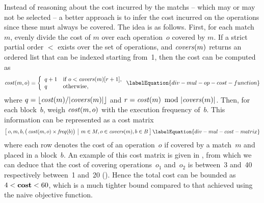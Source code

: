Instead of reasoning about the cost incurred by the \glspl{match} -- which may
or may not be selected -- a better approach is to infer the cost incurred on the
\glspl{operation} since these must always be covered.
%
The idea is as follows.
%
First, for each \gls{match}~$m$, evenly divide the cost of $m$ over each
\gls{operation}~$o$ covered by $m$.
%
If a strict partial order $<$ exists over the set of \glspl{operation}, and
$\operatorname{\textrm{\textit{covers}}}(m)$ returns an ordered list that can be indexed starting from~\num{1},
then the cost can be computed as
%
\begin{equation}
  \mOpCost(m, o) =
  \left\{
  \begin{array}{ll}
    q + 1 & \text{if $o < \mCovers(m)[r+1]$}, \\
    q     & \text{otherwise}, \\
  \end{array}
  \right.
  \labelEquation{div-mul-op-cost-function}
\end{equation}
%
where \mbox{$q = \lfloor \mCost(m) / \mCard{\!\mCovers(m)} \rfloor$} and
\mbox{$r = \mCost(m) \! \mod \mCard{\!\mCovers(m)}$}.
%
Then, for each \gls{block}~$b$, weigh \mbox{$\operatorname{\textrm{\textit{cost}}}(m, o)$} with the execution
frequency of~$b$.
%
This information can be represented as a cost matrix
%
\begin{equation}
  \begin{bmatrix}
    \begin{array}{@{\:}c|c@{\:}}
        o, m, b, \big( \mOpCost(m, o) \times \mFreq(b) \big)
      & m \in \mMatchSet, o \in \mCovers(m), b \in \mBlockSet
    \end{array}
  \end{bmatrix}
  \labelEquation{div-mul-cost-matrix}
\end{equation}
%
where each row denotes the cost of an \gls{operation}~$o$ if covered by a
\gls{match}~$m$ and placed in a \gls{block}~$b$.
%
An example of this cost matrix is given in , from which
we can deduce that the cost of covering \glspl{operation}~$o_1$ and~$o_2$ is
between~\num{3} and~\num{40} respectively between~\num{1} and~\num{20}
().
%
Hence the total cost can be bounded as \mbox{$4 < \mVar{cost} < 60$}, which is a
much tighter bound compared to that achieved using the naive \gls{objective
  function}.

